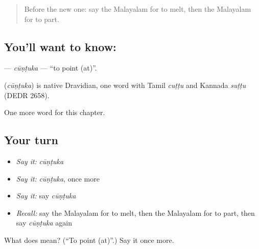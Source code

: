 \begin{quote}
Before the new one: say the Malayalam for to melt, then the Malayalam for to part.
\end{quote}

\subsection*{You'll want to know: }
\textbf{} — \emph{cūṇṭuka} — \textquotedblleft{}to point (at)\textquotedblright{}.

\begin{cousinweb}
\textbf{} (\emph{cūṇṭuka}) is native Dravidian, one word with Tamil \emph{cuṭṭu} and Kannada \emph{suṭṭu} (DEDR 2658).
\end{cousinweb}

\begin{grammarlens}[title={What you've built}]
One more word for this chapter.
\end{grammarlens}

\subsection*{Your turn}
\begin{itemize}
\raggedright
  \item \emph{Say it:} \emph{cūṇṭuka}
  \item \emph{Say it:} \emph{cūṇṭuka}, once more
  \item \emph{Say it:} say \emph{cūṇṭuka}
  \item \emph{Recall:} say the Malayalam for to melt, then the Malayalam for to part, then say \emph{cūṇṭuka} again
\end{itemize}

\begin{tcolorbox}[breakable,colback=teal!4,colframe=teal!35!black,title={Before you move on}]
What does  mean? (\textquotedblleft{}To point (at)\textquotedblright{}.) Say it once more.
\end{tcolorbox}

